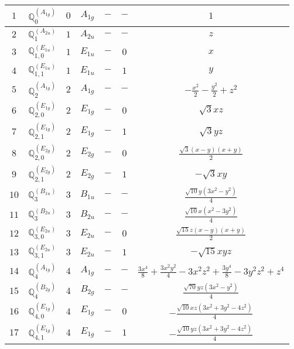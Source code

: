 \documentclass[fleqn,10pt,landscape]{article}
\begin{document}
\begin{itemize}
\begin{center}
\begin{longtable}{ccccccc}
$ 1 $ & $ \mathbb{Q}_{0}^{(A_{1g})} $ & $ 0 $ & $ A_{1g} $ & $ - $ & $ - $ & $ 1 $ \\ \hline
$ 2 $ & $ \mathbb{Q}_{1}^{(A_{2u})} $ & $ 1 $ & $ A_{2u} $ & $ - $ & $ - $ & $ z $ \\
$ 3 $ & $ \mathbb{Q}_{1,0}^{(E_{1u})} $ & $ 1 $ & $ E_{1u} $ & $ - $ & $ 0 $ & $ x $ \\
$ 4 $ & $ \mathbb{Q}_{1,1}^{(E_{1u})} $ & $ 1 $ & $ E_{1u} $ & $ - $ & $ 1 $ & $ y $ \\ \hline
$ 5 $ & $ \mathbb{Q}_{2}^{(A_{1g})} $ & $ 2 $ & $ A_{1g} $ & $ - $ & $ - $ & $ - \frac{x^{2}}{2} - \frac{y^{2}}{2} + z^{2} $ \\
$ 6 $ & $ \mathbb{Q}_{2,0}^{(E_{1g})} $ & $ 2 $ & $ E_{1g} $ & $ - $ & $ 0 $ & $ \sqrt{3} x z $ \\
$ 7 $ & $ \mathbb{Q}_{2,1}^{(E_{1g})} $ & $ 2 $ & $ E_{1g} $ & $ - $ & $ 1 $ & $ \sqrt{3} y z $ \\
$ 8 $ & $ \mathbb{Q}_{2,0}^{(E_{2g})} $ & $ 2 $ & $ E_{2g} $ & $ - $ & $ 0 $ & $ \frac{\sqrt{3} \left(x - y\right) \left(x + y\right)}{2} $ \\
$ 9 $ & $ \mathbb{Q}_{2,1}^{(E_{2g})} $ & $ 2 $ & $ E_{2g} $ & $ - $ & $ 1 $ & $ - \sqrt{3} x y $ \\ \hline
$ 10 $ & $ \mathbb{Q}_{3}^{(B_{1u})} $ & $ 3 $ & $ B_{1u} $ & $ - $ & $ - $ & $ \frac{\sqrt{10} y \left(3 x^{2} - y^{2}\right)}{4} $ \\
$ 11 $ & $ \mathbb{Q}_{3}^{(B_{2u})} $ & $ 3 $ & $ B_{2u} $ & $ - $ & $ - $ & $ \frac{\sqrt{10} x \left(x^{2} - 3 y^{2}\right)}{4} $ \\
$ 12 $ & $ \mathbb{Q}_{3,0}^{(E_{2u})} $ & $ 3 $ & $ E_{2u} $ & $ - $ & $ 0 $ & $ \frac{\sqrt{15} z \left(x - y\right) \left(x + y\right)}{2} $ \\
$ 13 $ & $ \mathbb{Q}_{3,1}^{(E_{2u})} $ & $ 3 $ & $ E_{2u} $ & $ - $ & $ 1 $ & $ - \sqrt{15} x y z $ \\ \hline
$ 14 $ & $ \mathbb{Q}_{4}^{(A_{1g})} $ & $ 4 $ & $ A_{1g} $ & $ - $ & $ - $ & $ \frac{3 x^{4}}{8} + \frac{3 x^{2} y^{2}}{4} - 3 x^{2} z^{2} + \frac{3 y^{4}}{8} - 3 y^{2} z^{2} + z^{4} $ \\
$ 15 $ & $ \mathbb{Q}_{4}^{(B_{2g})} $ & $ 4 $ & $ B_{2g} $ & $ - $ & $ - $ & $ \frac{\sqrt{70} y z \left(3 x^{2} - y^{2}\right)}{4} $ \\
$ 16 $ & $ \mathbb{Q}_{4,0}^{(E_{1g})} $ & $ 4 $ & $ E_{1g} $ & $ - $ & $ 0 $ & $ - \frac{\sqrt{10} x z \left(3 x^{2} + 3 y^{2} - 4 z^{2}\right)}{4} $ \\
$ 17 $ & $ \mathbb{Q}_{4,1}^{(E_{1g})} $ & $ 4 $ & $ E_{1g} $ & $ - $ & $ 1 $ & $ - \frac{\sqrt{10} y z \left(3 x^{2} + 3 y^{2} - 4 z^{2}\right)}{4} $ \\

\end{longtable}
\end{center}
\end{itemize}
\end{document}
